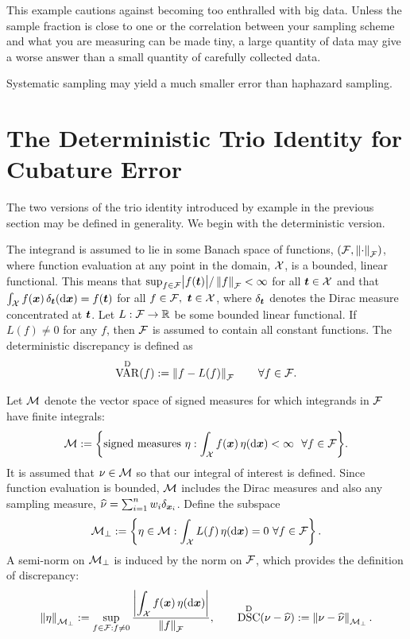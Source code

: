 \documentclass[graybox,footinfo]{svmult}
\DeclareMathOperator{\disc}{DSC}
\DeclareMathOperator{\Var}{VAR}
\begin{document}
This example cautions against becoming too enthralled with big data. Unless the sample 
fraction is close to one or the correlation between 
your sampling scheme and what you are measuring can be made tiny, a large quantity of 
data may give a worse answer than a small quantity of carefully collected data.

\begin{FJHLesson}
	Systematic sampling may yield a much smaller error than haphazard sampling.
\end{FJHLesson}

\section{The Deterministic Trio Identity for Cubature Error}
The two versions of the trio identity introduced by example in the previous section may 
be defined in generality. We begin with the deterministic version.  

The integrand is 
assumed to lie in some Banach space of 
functions, $(\mathcal{F},\left \lVert \cdot \right \rVert_{\mathcal{F}})$, where function evaluation at any point  in the 
domain,  $\mathcal{X}$, is a 
bounded, linear functional.  This means that $\sup_{f \in \mathcal{F}} \bigl \lvert f({\boldsymbol{t}}) \bigr \rvert/\left \lVert f \right \rVert_{\mathcal{F}} < 
\infty$ for all ${\boldsymbol{t}} \in \mathcal{X}$ and that $\int_{\mathcal{X}} f({\boldsymbol{x}}) \, \delta_{{\boldsymbol{t}}}(\mathrm{d}{\boldsymbol{x}}) =f({\boldsymbol{t}})$ 
for all $f \in \mathcal{F}, \ {\boldsymbol{t}} \in \mathcal{X}$, where $\delta_{{\boldsymbol{t}}}$ denotes the Dirac measure 
concentrated at ${\boldsymbol{t}}$.  Let $L :\mathcal{F} \to {\mathbb{R}}$ be some bounded 
linear functional.  If $L(f) \ne 0$ for any $f$, then $\mathcal{F}$ is assumed to contain all 
constant functions.  The deterministic discrepancy is defined as 
\begin{equation}  \label{FJH:eq:detvardef}
\Var^{\Dt}(f) := \norm{f- L(f)}_{\cf} \qquad \forall f \in \cf.
\end{equation} 

Let $\mathcal{M}$ denote the vector space of signed measures for which integrands in $\mathcal{F}$ 
have finite integrals:
\begin{equation*}
\cm : = \biggl \{\text{signed measures } \eta : \int_{\cx} f(\bsx) \, \eta(\D\bsx) < \infty \ \ 
\forall f \in \cf \biggr \}.
\end{equation*}
It is assumed that $\nu \in \mathcal{M}$ so that our integral of interest is defined.  Since function 
evaluation is bounded, $\mathcal{M}$ includes the Dirac measures and also any 
sampling measure, $\widehat{\nu} = \sum_{i=1}^n w_i \delta_{{\boldsymbol{x}}_i}$.  Define the subspace  
\begin{equation} \label{FJH:eq:Mperpdef}
\cm_\bot : = \left \{\eta \in \cm :  \int_{\cx} L(f) \, \eta(\D\bsx) = 0  \ \forall f \in \cf
\right\}.
\end{equation} 
A semi-norm on $\mathcal{M}_\bot$ is induced by the norm on $\mathcal{F}$, which provides the 
definition of discrepancy:
\begin{equation} \label{FJH:eq:detdiscdef}
\snorm{\eta}_{\cm_\bot}  : =\sup_{f \in \cf : f \ne 0} \frac{\displaystyle \biggabs{\int_{\cx} 
f(\bsx) \, \eta(\D \bsx)}}{\norm{f}_{\cf}}, \qquad \disc^\Dt(\nu - \hnu) : = \norm{\nu - 
\hnu}_{\cm_\bot}.
\end{equation}
\end{document}
